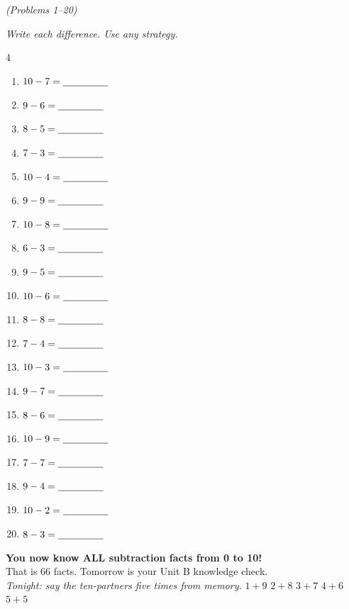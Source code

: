 \documentclass[12pt, letterpaper]{article}
\begin{document}
\bigskip
{} \hfill \textit{(Problems 1–20)}

\medskip\noindent\textit{Write each difference. Use any strategy.}

\bigskip
\begin{multicols}{4}
\begin{enumerate}[leftmargin=*,label=\textbf{\arabic*.},itemsep=9pt]
  \item $10-7=\underline{\hspace{1.6cm}}$
  \item $9-6=\underline{\hspace{1.6cm}}$
  \item $8-5=\underline{\hspace{1.6cm}}$
  \item $7-3=\underline{\hspace{1.6cm}}$
  \item $10-4=\underline{\hspace{1.6cm}}$
  \item $9-9=\underline{\hspace{1.6cm}}$
  \item $10-8=\underline{\hspace{1.6cm}}$
  \item $6-3=\underline{\hspace{1.6cm}}$
  \item $9-5=\underline{\hspace{1.6cm}}$
  \item $10-6=\underline{\hspace{1.6cm}}$
  \item $8-8=\underline{\hspace{1.6cm}}$
  \item $7-4=\underline{\hspace{1.6cm}}$
  \item $10-3=\underline{\hspace{1.6cm}}$
  \item $9-7=\underline{\hspace{1.6cm}}$
  \item $8-6=\underline{\hspace{1.6cm}}$
  \item $10-9=\underline{\hspace{1.6cm}}$
  \item $7-7=\underline{\hspace{1.6cm}}$
  \item $9-4=\underline{\hspace{1.6cm}}$
  \item $10-2=\underline{\hspace{1.6cm}}$
  \item $8-3=\underline{\hspace{1.6cm}}$
\end{enumerate}
\end{multicols}

\bigskip
\begin{checkbox}
\textbf{\color{sd-green}You now know ALL subtraction facts from 0 to 10!}\\[3pt]
That is 66 facts. Tomorrow is your Unit B knowledge check.\\[3pt]
\textit{Tonight: say the ten-partners five times from memory.}\quad
$1+9$\; $2+8$\; $3+7$\; $4+6$\; $5+5$
\end{checkbox}
\end{document}
